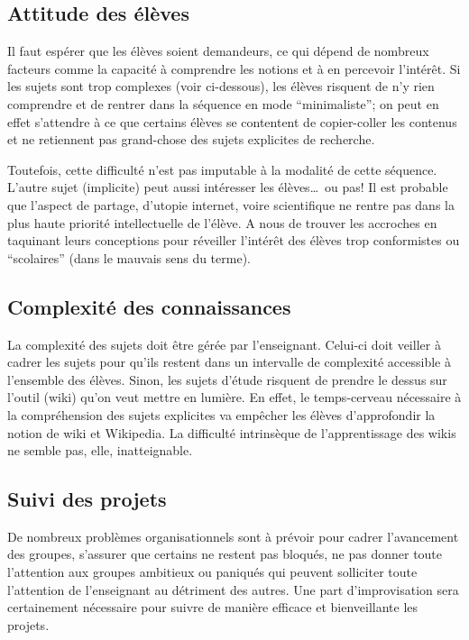 \documentclass[11pt,bibliography=totoc]{scrartcl}
\begin{document}
\subsection{Attitude des élèves}
Il faut espérer que les élèves soient demandeurs, ce qui dépend de nombreux
facteurs comme la capacité à comprendre les notions et à en percevoir
l'intérêt. Si les sujets sont trop complexes (voir ci-dessous), les élèves
risquent de n'y rien comprendre et de rentrer dans la séquence en mode
``minimaliste''; on peut en effet s'attendre à ce que certains élèves se
contentent de copier-coller les contenus et ne retiennent pas grand-chose des
sujets explicites de recherche.

Toutefois, cette difficulté n'est pas imputable à la modalité de cette séquence.
L'autre sujet (implicite) peut aussi intéresser les élèves\ldots\ ou pas! Il est
probable que l'aspect de partage, d'utopie internet, voire scientifique ne
rentre pas dans la plus haute priorité intellectuelle de l'élève. A nous de
trouver les accroches en taquinant leurs conceptions pour réveiller l'intérêt
des élèves trop conformistes ou ``scolaires'' (dans le mauvais sens du terme).

\subsection{Complexité des connaissances}
La complexité des sujets doit être gérée par l'enseignant. Celui-ci doit veiller
à cadrer les sujets pour qu'ils restent dans un intervalle de complexité
accessible à l'ensemble des élèves. Sinon, les sujets d'étude risquent de
prendre le dessus sur l'outil (wiki) qu'on veut mettre en lumière. En effet, le
temps-cerveau nécessaire à la compréhension des sujets explicites va empêcher
les élèves d'approfondir la notion de wiki et Wikipedia.  La difficulté
intrinsèque de l'apprentissage des wikis ne semble pas, elle, inatteignable.

\subsection{Suivi des projets}
De nombreux problèmes organisationnels sont à prévoir pour cadrer l'avancement
des groupes, s'assurer que certains ne restent pas bloqués, ne pas donner toute
l'attention aux groupes ambitieux ou paniqués qui peuvent solliciter toute
l'attention de l'enseignant au détriment des autres.  Une part d'improvisation
sera certainement nécessaire pour suivre de manière efficace et bienveillante
les projets.
\end{document}
